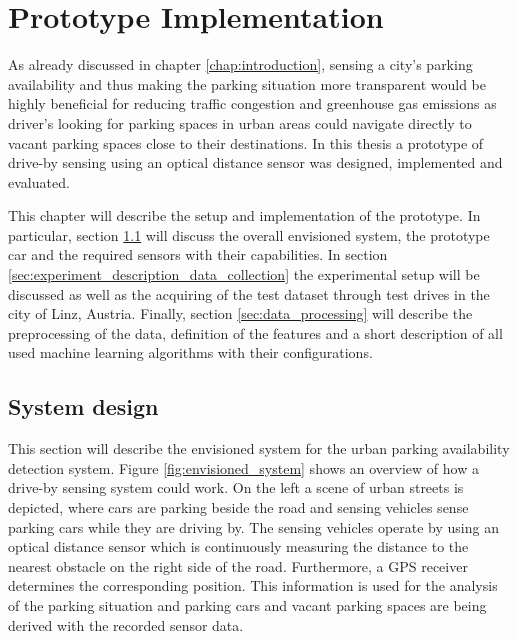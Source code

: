 \chapter{Prototype Implementation}
\label{chap:referenceimplementation}

As already discussed in chapter \ref{chap:introduction}, sensing a city's parking availability and thus making the parking situation more transparent would be highly beneficial for reducing traffic congestion and greenhouse gas emissions as driver's looking for parking spaces in urban areas could navigate directly to vacant parking spaces close to their destinations. In this thesis a prototype of drive-by sensing using an optical distance sensor was designed, implemented and evaluated.

This chapter will describe the setup and implementation of the prototype. In particular, section \ref{sec:system_design} will discuss the overall envisioned system, the prototype car and the required sensors with their capabilities. In section \ref{sec:experiment_description_data_collection} the experimental setup will be discussed as well as the acquiring of the test dataset through test drives in the city of Linz, Austria. Finally, section \ref{sec:data_processing} will describe the preprocessing of the data, definition of the features and a short description of all used machine learning algorithms with their configurations. 




\section{System design}
\label{sec:system_design}


This section will describe the envisioned system for the urban parking availability detection system. Figure \ref{fig:envisioned_system} shows an overview of how a drive-by sensing system could work. On the left a scene of urban streets is depicted, where cars are parking beside the road and sensing vehicles sense parking cars while they are driving by. The sensing vehicles operate by using an optical distance sensor which is continuously measuring the distance to the nearest obstacle on the right side of the road. Furthermore, a GPS receiver determines the corresponding position. This information is used for the analysis of the parking situation and parking cars and vacant parking spaces are being derived with the recorded sensor data.

